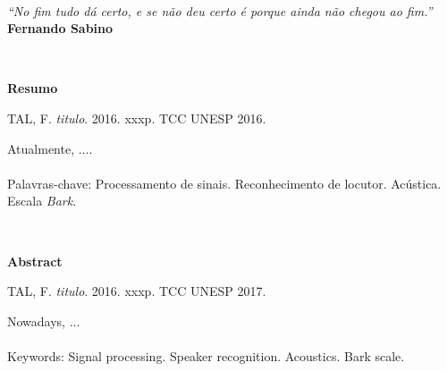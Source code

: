 \documentclass[a4paper,12pt,twoside,openright]{report}
\begin{document}
\newpage\ \thispagestyle{empty} \newpage

\newpage
\vspace*{+480pt}
\thispagestyle{empty}
\begin{flushright}
\textit{``No fim tudo d\'{a} certo, e se n\~{a}o deu certo \'{e} porque ainda n\~{a}o chegou ao fim.''}
\\
\textbf{Fernando Sabino}
\end{flushright}

\newpage\ \thispagestyle{empty} \newpage

\newpage
\thispagestyle{empty}
\noindent
\begin{center}\textbf{\huge{Resumo}}\end{center} 
\vspace*{+60pt}
\begin{singlespace}
TAL, F. \textit{titulo}. 2016. xxxp. TCC UNESP 2016.
\end{singlespace}
\vspace*{+20pt}
Atualmente, ....
\\
\\
Palavras-chave: Processamento de sinais. Reconhecimento de locutor. Ac\'{u}stica. Escala \textit{Bark}.

\newpage\ \thispagestyle{empty} \newpage

\newpage
\thispagestyle{empty}
\noindent
\begin{center}\textbf{\huge{Abstract}}\end{center} 
\vspace*{+60pt}
\begin{singlespace}
TAL, F. \textit{titulo}. 2016. xxxp. TCC UNESP 2017.
\end{singlespace}
\vspace*{+20pt}
Nowadays, ...
\\
\\
Keywords: Signal processing. Speaker recognition. Acoustics. Bark scale.

\newpage\ \thispagestyle{empty} \newpage
\end{document}
